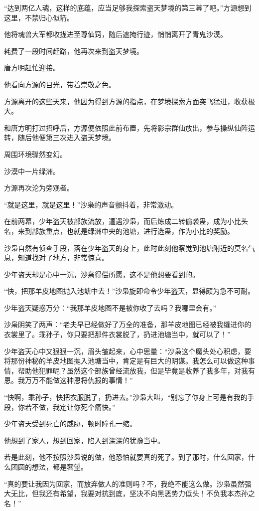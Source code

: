\begin{this_body}
“达到两亿人魂，这样的底蕴，应当足够我探索盗天梦境的第三幕了吧。”方源想到这里，不禁归心似箭。

他将魂兽大军都收拢进至尊仙窍，随后遮掩行迹，悄悄离开了青鬼沙漠。

耗费了一段时间赶路，他再次来到盗天梦境。

唐方明赶忙迎接。

他看向方源的目光，带着崇敬之色。

方源离开的这些天来，他因为得到方源的指点，在梦境探索方面突飞猛进，收获极大。

和唐方明打过招呼后，方源便依照此前布置，先将影宗群仙放出，参与操纵仙阵运转，随后他便第三次进入盗天梦境。

周围环境骤然变幻。

沙漠中一片绿洲。

方源再次沦为旁观者。

“就是这里，就是这里！”沙枭的声音颤抖着，非常激动。

在前两幕，少年盗天被部族流放，遭遇沙枭，而后炼成二转偷袭蛊，成为小比头名，来到部族重点，也就是绿洲中央的池塘，进行选蛊，作为小比的奖励。

沙枭自然有侦查手段，落在少年盗天的身上，此时此刻他察觉到池塘附近的莫名气息，知道找对了地方，非常惊喜。

少年盗天却是心中一沉，沙枭得偿所愿，这不是他想要看到的。

“快，把那羊皮地图抛入池塘中去！”沙枭旋即命令少年盗天，显得颇为急不可耐。

少年盗天疑惑万分：“我那羊皮地图不是被你收了去吗？我哪里会有。”

沙枭阴笑了两声：“老夫早已经做好了万全的准备，那羊皮地图已经被我缝进你的衣裳里了。乖孙子，你只要把那件衣裳脱了，扔进池塘当中，就可以了！”

少年盗天心中又狠狠一沉，眉头皱起来，心中思量：“沙枭这个魔头处心积虑，要将那份神秘的羊皮地图抛入池塘当中，肯定是有巨大的阴谋。我怎么可以做这种事情，帮助他犯罪呢？虽然这个部族曾经流放我，但是毕竟是收养了我多年，对我有恩。我万万不能做这种恩将仇报的事情！”

“快啊，乖孙子，快把衣服脱了，扔进去。”沙枭大叫，“别忘了你身上可是有我的手段，你若不做，我定让你死个痛快。”

少年盗天受到死亡的威胁，顿时瞳孔一缩。

他想到了家人，想到回家，陷入到深深的犹豫当中。

若是此刻，他不按照沙枭说的做，他恐怕就要真的死了。到了那时，什么回家，什么团圆的想法，都是奢望。

“真的要让我因为回家，而放弃做人的准则吗？不，我绝不能这么做。沙枭虽然强大无比，但我还有希望，我要对抗到底，坚决不向黑恶势力低头！不负我本杰孙之名！”


\end{this_body}
